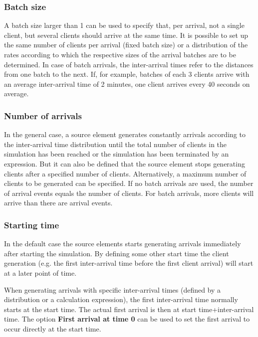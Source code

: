 \subsubsection*{Batch size}

A batch size larger than 1 can be used to specify that, per arrival, not a single client,
but several clients should arrive at the same time. It is possible to set up the same number
of clients per arrival (fixed batch size) or a distribution of the rates according to which
the respective sizes of the arrival batches are to be determined.
In case of batch arrivals, the inter-arrival times refer to the distances from one batch to the next.
If, for example, batches of each 3 clients arrive with an average inter-arrival time of 2 minutes,
one client arrives every 40 seconds on average.

\subsubsection*{Number of arrivals}

In the general case, a source element generates constantly arrivals according to the
inter-arrival time distribution until the total number of clients in the simulation has been reached
or the simulation has been terminated by an expression. But it can also be defined that the
source element stops generating clients after a specified number of clients.
Alternatively, a maximum number of clients to be generated can be specified.
If no batch arrivals are used, the number of arrival events equals the
number of clients. For batch arrivals, more clients will arrive than there are arrival events.

\subsubsection*{Starting time}

In the default case the source elements starts generating arrivals immediately after
starting the simulation. By defining some other start time the client generation
(e.g. the first inter-arrival time before the first client arrival) will start at a later
point of time.

When generating arrivals with specific inter-arrival times (defined by a distribution
or a calculation expression), the first inter-arrival time normally starts at the start time.
The actual first arrival is then at start time+inter-arrival time. The option
\textbf{First arrival at time 0} can be used to set the first arrival to occur
directly at the start time.

